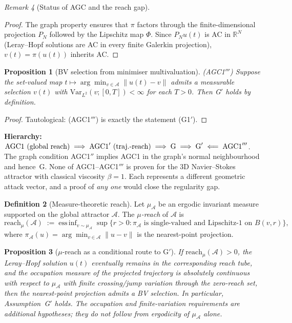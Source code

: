 \documentclass[12pt,a4paper]{article}
\theoremstyle{definition}
\newtheorem{definition}{Definition}[section]
\theoremstyle{plain}
\newtheorem{proposition}[definition]{Proposition}
\theoremstyle{remark}
\newtheorem{remark}[definition]{Remark}
\begin{document}
\begin{remark}[Status of AGC and the reach gap]
\begin{proof}
The graph property ensures that $\pi$ factors through the
finite-dimensional projection $P_N$ followed by the Lipschitz map
$\Phi$. Since $P_N u(t)$ is AC in $\mathbb{R}^N$ (Leray--Hopf
solutions are AC in every finite Galerkin projection),
$v(t) = \pi(u(t))$ inherits AC.
\end{proof}

\begin{proposition}[BV selection from minimiser multivaluation]
\label{prop:bv-selection}
\textup{(AGC1$'''$)}\;
Suppose the set-valued map $t \mapsto \arg\min_{v \in \mathcal{A}}
\|u(t)-v\|$ admits a measurable selection $v(t)$ with
$\mathrm{Var}_{L^2}(v; [0,T]) < \infty$ for each $T > 0$.
Then G$'$ holds by definition.
\end{proposition}

\begin{proof}
Tautological: (AGC1$'''$) is exactly the statement (G1$'$).
\end{proof}

\noindent
\textbf{Hierarchy:}\;
$\textup{AGC1 (global reach)}
\;\Longrightarrow\;
\textup{AGC1}' \textup{ (traj.-reach)}
\;\Longrightarrow\;
\textup{G}
\;\Longrightarrow\;
\textup{G}'
\;\Longleftarrow\;
\textup{AGC1}'''$.
The graph condition AGC1$''$ implies AGC1 in the graph's normal
neighbourhood and hence~G.
None of AGC1--AGC1$'''$ is proven for the 3D Navier--Stokes attractor
with classical viscosity $\beta = 1$. Each represents a different
geometric attack vector, and a proof of \emph{any one} would close the
regularity gap.

\begin{definition}[Measure-theoretic reach]\label{def:mu-reach}
Let $\mu_{\mathcal{A}}$ be an ergodic invariant measure supported on the
global attractor $\mathcal{A}$.
The \emph{$\mu$-reach} of $\mathcal{A}$ is
\[
  \mathrm{reach}_\mu(\mathcal{A})
  \;:=\; \mathrm{ess\,inf}_{v \sim \mu_{\mathcal{A}}}\;
  \sup\!\bigl\{r > 0 : \pi_{\mathcal{A}}
  \text{ is single-valued and Lipschitz-1 on } B(v,r)\bigr\},
\]
where $\pi_{\mathcal{A}}(u) = \arg\min_{v \in \mathcal{A}}\|u - v\|$ is the
nearest-point projection.
\end{definition}

\begin{proposition}[$\mu$-reach as a conditional route to G$'$]\label{prop:mu-reach}
If $\mathrm{reach}_\mu(\mathcal{A}) > 0$, the Leray--Hopf solution $u(t)$
eventually remains in the corresponding reach tube, and the occupation
measure of the projected trajectory is absolutely continuous with respect
to $\mu_{\mathcal{A}}$ with finite crossing/jump variation through the
zero-reach set, then the nearest-point projection admits a BV selection.
In particular, Assumption~G$'$ holds.  The occupation and finite-variation
requirements are additional hypotheses; they do not follow from
ergodicity of $\mu_{\mathcal{A}}$ alone.
\end{proposition}


\end{remark}
\end{document}
